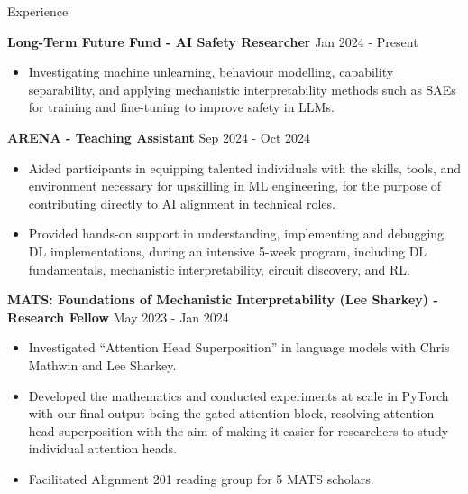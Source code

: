 \documentclass[hidelinks]{resume} %
\begin{document}
\begin{rSection}{Experience}
    
\textbf{Long-Term Future Fund - AI Safety Researcher}
\hfill {Jan 2024 - Present}
\begin{itemize}
    \item Investigating machine unlearning, behaviour modelling, capability separability, and applying mechanistic interpretability methods such as SAEs for training and fine-tuning to improve safety in LLMs.
\end{itemize}

\textbf{ARENA - Teaching Assistant}
\hfill{Sep 2024 - Oct 2024}
\begin{itemize}
    \item Aided participants in equipping talented individuals with the skills, tools, and environment necessary for upskilling in ML engineering, for the purpose of contributing directly to AI alignment in technical roles.
    \item Provided hands-on support in understanding, implementing and debugging DL implementations, during an intensive 5-week program, including DL fundamentals, mechanistic interpretability, circuit discovery, and RL.
\end{itemize}

\textbf{MATS: Foundations of Mechanistic Interpretability (Lee Sharkey) - Research Fellow}
\hfill {May 2023 - Jan 2024}
\begin{itemize}
    \item Investigated ``Attention Head Superposition'' in language models with Chris Mathwin and Lee Sharkey.
    \item Developed the mathematics and conducted experiments at scale in PyTorch with our final output being the gated attention block, resolving attention head superposition with the aim of making it easier for researchers to study individual attention heads.
    \item Facilitated Alignment 201 reading group for 5 MATS scholars.
\end{itemize}


\end{rSection}
\end{document}

